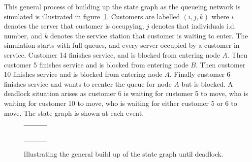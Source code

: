 \documentclass{article}
\begin{document}
This general process of building up the state graph as the queueing network is simulated is illustrated in figure~\ref{fig:general_buildup}.
Customers are labelled $(i, j, k)$ where $i$ denotes the server that customer is occupying, $j$ denotes that individuals i.d. number, and $k$ denotes the service station that customer is waiting to enter.
The simulation starts with full queues, and every server occupied by a customer in service.
Customer 14 finishes service, and is blocked from entering node $A$.
Then customer 5 finishes service and is blocked from entering node $B$.
Then customer 10 finishes service and is blocked from entering node $A$.
Finally customer 6 finishes service and wants to reenter the queue for node $A$ but is blocked.
A deadlock situation arises as customer 6 is waiting for customer 5 to move, who is waiting for customer 10 to move, who is waiting for either customer 5 or 6 to move.
The state graph is shown at each event.

\begin{figure}[H]
  \begin{center}
    \begin{tabular}{ c c c }
       & \hspace{0.1\textwidth} &
       \\
       & \hspace{0.1\textwidth} &
       \\
       & \hspace{0.1\textwidth} &
       \\
       & \hspace{0.1\textwidth} &
       \\
       & \hspace{0.1\textwidth} &
      
    \end{tabular}
  \end{center}
  \caption{Illustrating the general build up of the state graph until deadlock.}
  \label{fig:general_buildup}
\end{figure}
\end{document}
